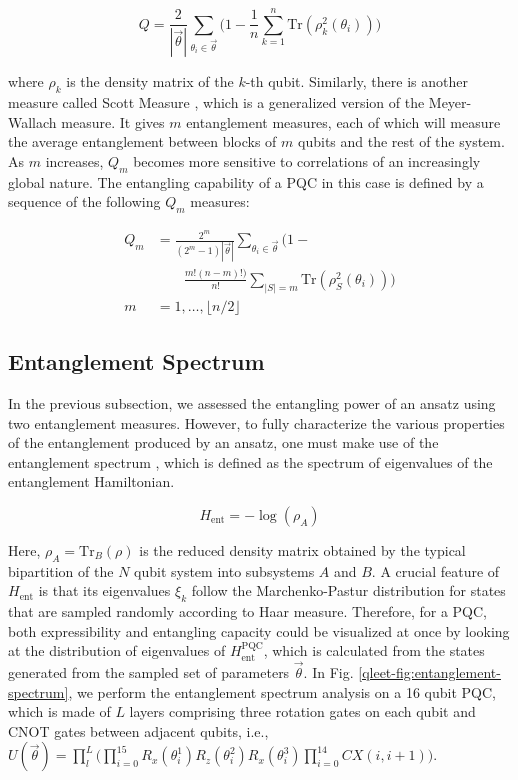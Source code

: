 \begin{equation}
	Q = \frac{2}{|\vec{\theta}|}\sum_{\theta_{i}\in \vec{\theta}}\Bigg(1-\frac{1}{n}\sum_{k=1}^{n}\text{Tr}(\rho_{k}^{2}(\theta_{i}))\Bigg)
\end{equation}

where $\rho_k$ is the density matrix of the $k$-th qubit. Similarly, there is another measure called Scott Measure \cite{10.1007/s11128-007-0052-7}, which is a generalized version of the Meyer-Wallach measure. It gives $m$ entanglement measures, each of which will measure the average entanglement between blocks of $m$ qubits and the rest of the system. As $m$ increases, $Q_m$ becomes more sensitive to correlations of an increasingly global nature. The entangling capability of a PQC in this case is defined by a sequence of the following $Q_m$ measures:


\begin{equation}
    \begin{split}
        Q_{m} &= \frac{2^{m}}{(2^{m}-1) |\vec{\theta}|}\sum_{\theta_i \in \vec{\theta}} \bigg(1 - \\ 
        & \quad \quad \frac{m! (n-m)!)}{n!}\sum_{|S|=m} \text{Tr} (\rho_{S}^2 (\theta_i)) \bigg) \\
        m &= 1, \ldots, \lfloor n/2 \rfloor
    \end{split}
\end{equation}


\subsection{Entanglement Spectrum}

In the previous subsection, we assessed the entangling power of an ansatz using two entanglement measures. However, to fully characterize the various properties of the entanglement produced by an ansatz, one must make use of the entanglement spectrum \cite{PhysRevLett.115.267206, PRXQuantum.1.020319}, which is defined as the spectrum of eigenvalues of the entanglement Hamiltonian.

\begin{equation}
    H_{\text{ent}} = -\log (\rho_A)
\end{equation}

Here, $\rho_A = \text{Tr}_B(\rho)$ is the reduced density matrix obtained by the typical bipartition of the $N$ qubit system into subsystems $A$ and $B$. A crucial feature of $H_{\text{ent}}$ is that its eigenvalues $\xi_k$ follow the Marchenko-Pastur distribution \cite{10.1088/1751-8113/40/3/f04} for states that are sampled randomly according to Haar measure. Therefore, for a PQC, both expressibility and entangling capacity could be visualized at once by looking at the distribution of eigenvalues of $H_{\text{ent}}^{\text{PQC}}$, which is calculated from the states generated from the sampled set of parameters $\vec{\theta}$. In Fig. \ref{qleet-fig:entanglement-spectrum}, we perform the entanglement spectrum analysis on a 16 qubit PQC, which is made of $L$ layers comprising three rotation gates on each qubit and CNOT gates between adjacent qubits, i.e., $U(\vec{\theta}) = \prod_{l}^{L}\big(\prod_{i=0}^{15}R_x(\theta_i^1)R_z(\theta_i^2)R_x(\theta_i^3)\prod_{i=0}^{14}CX(i, i+1)\big)$.

